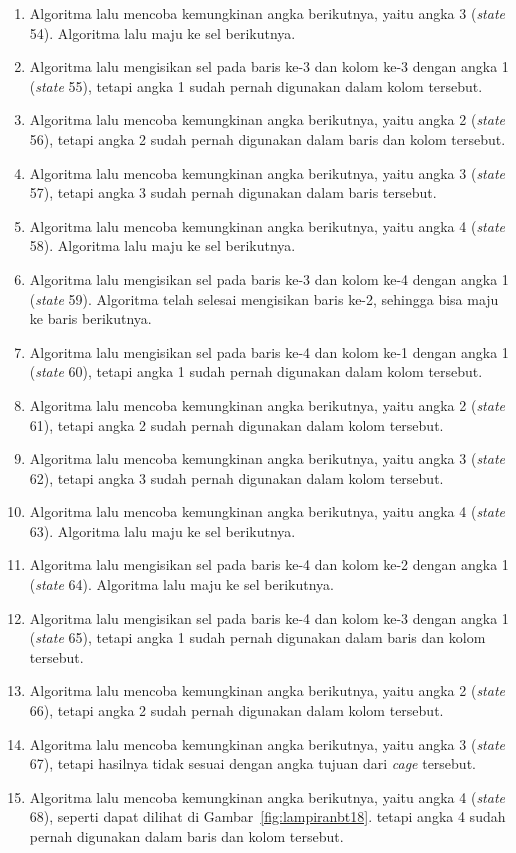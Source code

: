 \begin{enumerate}
\item Algoritma lalu mencoba kemungkinan angka berikutnya, yaitu angka 3 (\textit{state} 54). Algoritma lalu maju ke sel berikutnya.
\item Algoritma lalu mengisikan sel pada baris ke-3 dan kolom ke-3 dengan angka 1 (\textit{state} 55), tetapi angka 1 sudah pernah digunakan dalam kolom tersebut.
\item Algoritma lalu mencoba kemungkinan angka berikutnya, yaitu angka 2 (\textit{state} 56), tetapi angka 2 sudah pernah digunakan dalam baris dan kolom tersebut.
\item Algoritma lalu mencoba kemungkinan angka berikutnya, yaitu angka 3 (\textit{state} 57), tetapi angka 3 sudah pernah digunakan dalam baris tersebut.
\item Algoritma lalu mencoba kemungkinan angka berikutnya, yaitu angka 4 (\textit{state} 58). Algoritma lalu maju ke sel berikutnya.
\item Algoritma lalu mengisikan sel pada baris ke-3 dan kolom ke-4 dengan angka 1 (\textit{state} 59). Algoritma telah selesai mengisikan baris ke-2, sehingga bisa maju ke baris berikutnya.
\item Algoritma lalu mengisikan sel pada baris ke-4 dan kolom ke-1 dengan angka 1 (\textit{state} 60), tetapi angka 1 sudah pernah digunakan dalam kolom tersebut.
\item Algoritma lalu mencoba kemungkinan angka berikutnya, yaitu angka 2 (\textit{state} 61), tetapi angka 2 sudah pernah digunakan dalam kolom tersebut.
\item Algoritma lalu mencoba kemungkinan angka berikutnya, yaitu angka 3 (\textit{state} 62), tetapi angka 3 sudah pernah digunakan dalam kolom tersebut.
\item Algoritma lalu mencoba kemungkinan angka berikutnya, yaitu angka 4 (\textit{state} 63). Algoritma lalu maju ke sel berikutnya.
\item Algoritma lalu mengisikan sel pada baris ke-4 dan kolom ke-2 dengan angka 1 (\textit{state} 64). Algoritma lalu maju ke sel berikutnya.
\item Algoritma lalu mengisikan sel pada baris ke-4 dan kolom ke-3 dengan angka 1 (\textit{state} 65), tetapi angka 1 sudah pernah digunakan dalam baris dan kolom tersebut.
\item Algoritma lalu mencoba kemungkinan angka berikutnya, yaitu angka 2 (\textit{state} 66), tetapi angka 2 sudah pernah digunakan dalam kolom tersebut.
\item Algoritma lalu mencoba kemungkinan angka berikutnya, yaitu angka 3 (\textit{state} 67), tetapi hasilnya tidak sesuai dengan angka tujuan dari \textit{cage} tersebut.
\item Algoritma lalu mencoba kemungkinan angka berikutnya, yaitu angka 4 (\textit{state} 68), seperti dapat dilihat di Gambar~\ref{fig:lampiranbt18}. tetapi angka 4 sudah pernah digunakan dalam baris dan kolom tersebut.


\end{enumerate}
